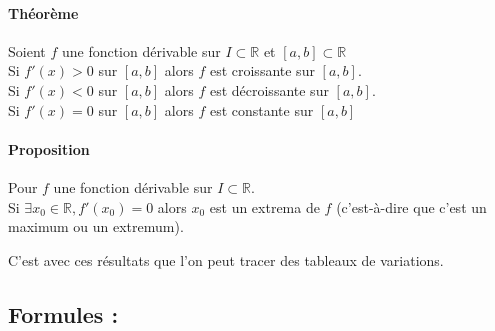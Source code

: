 \documentclass[11pt]{article}
\newcommand{\R}{\mathbb R}
\begin{document}
        \paragraph{Théorème} Soient $f$ une fonction dérivable sur $I\subset\R$ et $[a,b]\subset\R$\\
        Si $f'(x)>0$ sur $[a,b]$ alors $f$ est croissante sur $[a,b]$.\\
        Si $f'(x)<0$ sur $[a,b]$ alors $f$ est décroissante sur $[a,b]$.\\
        Si $f'(x)=0$ sur $[a,b]$ alors $f$ est constante sur $[a,b]$

        \paragraph{Proposition} Pour $f$ une fonction dérivable sur $I\subset \R$.\\
        Si $\exists x_0 \in \R, f'(x_0)=0$ alors $x_0$ est un extrema de $f$ (c'est-à-dire que c'est un maximum ou un extremum).
        
        C'est avec ces résultats que l'on peut tracer des tableaux de variations.

        \subsection{Formules :}
       
\end{document}
